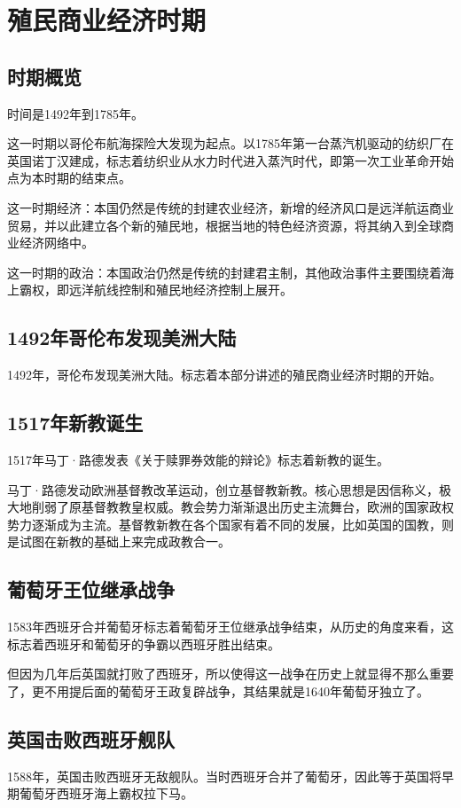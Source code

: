 \documentclass[12pt,oneside]{book}
\begin{document}
\part{殖民商业经济时期}

\chapter{时期概览}
时间是1492年到1785年。

这一时期以哥伦布航海探险大发现为起点。以1785年第一台蒸汽机驱动的纺织厂在英国诺丁汉建成，标志着纺织业从水力时代进入蒸汽时代，即第一次工业革命开始点为本时期的结束点。

这一时期经济：本国仍然是传统的封建农业经济，新增的经济风口是远洋航运商业贸易，并以此建立各个新的殖民地，根据当地的特色经济资源，将其纳入到全球商业经济网络中。

这一时期的政治：本国政治仍然是传统的封建君主制，其他政治事件主要围绕着海上霸权，即远洋航线控制和殖民地经济控制上展开。



\chapter{1492年哥伦布发现美洲大陆}
1492年，哥伦布发现美洲大陆。标志着本部分讲述的殖民商业经济时期的开始。

\chapter{1517年新教诞生}
1517年马丁·路德发表《关于赎罪券效能的辩论》标志着新教的诞生。

马丁·路德发动欧洲基督教改革运动，创立基督教新教。核心思想是因信称义，极大地削弱了原基督教教皇权威。教会势力渐渐退出历史主流舞台，欧洲的国家政权势力逐渐成为主流。基督教新教在各个国家有着不同的发展，比如英国的国教，则是试图在新教的基础上来完成政教合一。




\chapter{葡萄牙王位继承战争}
1583年西班牙合并葡萄牙标志着葡萄牙王位继承战争结束，从历史的角度来看，这标志着西班牙和葡萄牙的争霸以西班牙胜出结束。

但因为几年后英国就打败了西班牙，所以使得这一战争在历史上就显得不那么重要了，更不用提后面的葡萄牙王政复辟战争，其结果就是1640年葡萄牙独立了。



\chapter{英国击败西班牙舰队}
1588年，英国击败西班牙无敌舰队。当时西班牙合并了葡萄牙，因此等于英国将早期葡萄牙西班牙海上霸权拉下马。
\end{document}
